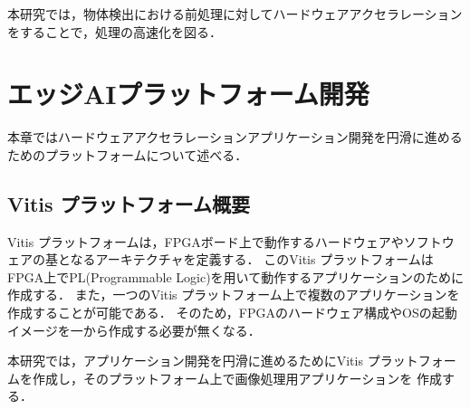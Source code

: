 \documentclass[11pt,a4j]{jreport}
\begin{document}
本研究では，物体検出における前処理に対してハードウェアアクセラレーションをすることで，処理の高速化を図る．
%
\chapter{エッジAIプラットフォーム開発}
本章ではハードウェアアクセラレーションアプリケーション開発を円滑に進めるためのプラットフォームについて述べる．
\section{Vitis プラットフォーム概要}
Vitis プラットフォーム\cite{VitisPlatform}は，FPGAボード上で動作するハードウェアやソフトウェアの基となるアーキテクチャを定義する．
このVitis プラットフォームはFPGA上でPL(Programmable Logic)を用いて動作するアプリケーションのために作成する．
また，一つのVitis プラットフォーム上で複数のアプリケーションを作成することが可能である．
そのため，FPGAのハードウェア構成やOSの起動イメージを一から作成する必要が無くなる．

本研究では，アプリケーション開発を円滑に進めるためにVitis プラットフォームを作成し，そのプラットフォーム上で画像処理用アプリケーションを
作成する．

\end{document}
